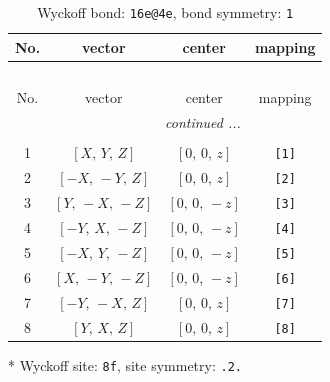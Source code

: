 \documentclass[fleqn,8pt]{jsarticle}
\begin{document}
\begin{longtable}{cccc}
\caption{Wyckoff bond: {\tt 16e@4e}, bond symmetry: {\tt 1}}
 \\
 \hline \hline
No. & vector & center & mapping \\ \hline \endfirsthead

\multicolumn{3}{l}{\tablename\ \thetable{}} \\
 \hline \hline
No. & vector & center & mapping \\ \hline \endhead

 \hline \hline
\multicolumn{3}{r}{\footnotesize\it continued ...} \\ \endfoot

 \hline \hline
\multicolumn{3}{r}{} \\ \endlastfoot

1 & $\left[ X,\, Y,\, Z \right]$ & $\left[ 0,\, 0,\, z \right]$ & {\tt [1]} \\ \hline
2 & $\left[ - X,\, - Y,\, Z \right]$ & $\left[ 0,\, 0,\, z \right]$ & {\tt [2]} \\ \hline
3 & $\left[ Y,\, - X,\, - Z \right]$ & $\left[ 0,\, 0,\, - z \right]$ & {\tt [3]} \\ \hline
4 & $\left[ - Y,\, X,\, - Z \right]$ & $\left[ 0,\, 0,\, - z \right]$ & {\tt [4]} \\ \hline
5 & $\left[ - X,\, Y,\, - Z \right]$ & $\left[ 0,\, 0,\, - z \right]$ & {\tt [5]} \\ \hline
6 & $\left[ X,\, - Y,\, - Z \right]$ & $\left[ 0,\, 0,\, - z \right]$ & {\tt [6]} \\ \hline
7 & $\left[ - Y,\, - X,\, Z \right]$ & $\left[ 0,\, 0,\, z \right]$ & {\tt [7]} \\ \hline
8 & $\left[ Y,\, X,\, Z \right]$ & $\left[ 0,\, 0,\, z \right]$ & {\tt [8]} \\
\end{longtable}
* Wyckoff site: {\tt 8f}, site symmetry: {\tt .2.}
\renewcommand{\arraystretch}{1.2}
\end{document}
